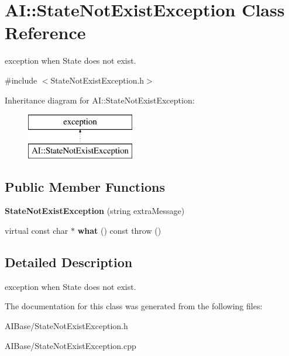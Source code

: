 \hypertarget{classAI_1_1StateNotExistException}{\section{A\-I\-:\-:State\-Not\-Exist\-Exception Class Reference}
\label{classAI_1_1StateNotExistException}
}


exception when State does not exist.  




{\ttfamily \#include $<$State\-Not\-Exist\-Exception.\-h$>$}

Inheritance diagram for A\-I\-:\-:State\-Not\-Exist\-Exception\-:\begin{figure}[H]
\begin{center}
\leavevmode
\includegraphics[height=2.000000cm]{classAI_1_1StateNotExistException}
\end{center}
\end{figure}
\subsection*{Public Member Functions}
\begin{DoxyCompactItemize}
\item 
\hypertarget{classAI_1_1StateNotExistException_afba608702bcd8aeb728c3a6a1ff109c1}{{\bfseries State\-Not\-Exist\-Exception} (string extra\-Message)}\label{classAI_1_1StateNotExistException_afba608702bcd8aeb728c3a6a1ff109c1}

\item 
\hypertarget{classAI_1_1StateNotExistException_a97f180bdeef94eb9939bb80caa008951}{virtual const char $\ast$ {\bfseries what} () const   throw ()}\label{classAI_1_1StateNotExistException_a97f180bdeef94eb9939bb80caa008951}

\end{DoxyCompactItemize}


\subsection{Detailed Description}
exception when State does not exist. 



The documentation for this class was generated from the following files\-:\begin{DoxyCompactItemize}
\item 
A\-I\-Base/State\-Not\-Exist\-Exception.\-h\item 
A\-I\-Base/State\-Not\-Exist\-Exception.\-cpp\end{DoxyCompactItemize}
